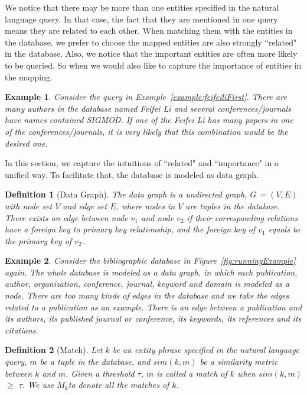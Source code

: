 \documentclass{vldb}
\newtheorem{example}{Example}
\newtheorem{definition}{Definition}
\begin{document}
We notice that there may be more than one entities specified in the natural language query.  In that case, the fact that they are mentioned in one query means they are related to each other.  When matching them with the entities in the database, we prefer to choose the mapped entities are also strongly ``related" in the database.  Also, we notice that the important entities are often more likely to be queried.  So when we would also like to capture the importance of entities in the mapping.   
\begin{example}
Consider the query in Example~\ref{example:feifeiliFirst}.  There are many authors in the database named Feifei Li and several conferences/journals have names contained SIGMOD.  If one of the Feifei Li has many papers in one of the conferences/journals, it is very likely that this combination would be the desired one.  
\end{example}

In this section, we capture the intuitions of ``related" and ``importance" in a unified way.  To facilitate that, the database is modeled as data graph.  
\begin{definition}[Data Graph]
The data graph is a undirected graph, $G$ = $(V, E)$ with node set $V$ and edge set $E$, where nodes in $V$ are tuples in the database.  There exists an edge between node $v_1$ and node $v_2$ if their corresponding relations have a foreign key to primary key relationship, and the foreign key of $v_1$ equals to the primary key of $v_2$.
\end{definition}

\begin{example}
\label{example:graph}
Consider the bibliographic database in Figure~\ref{fig:runningExample} again.  The whole database is modeled as a data graph, in which each publication, author, organization, conference, journal, keyword and domain is modeled as a node.  There are too many kinds of edges in the database and we take the edges related to a publication as an example.  There is an edge between a publication and its authors, its published journal or conference, its keywords, its references and its citations.  
\end{example}

\begin{definition}[Match]
Let $k$ be an entity phrase specified in the natural language query, $m$ be a tuple in the database, and $sim(k, m)$ be a similarity metric between $k$ and $m$.  Given a threshold $\tau$, $m$ is called a match of $k$ when $sim(k, m)$ $\geq$ $\tau$.  We use $M_k$to denote all the matches of $k$.  
\end{definition}
\end{document}
